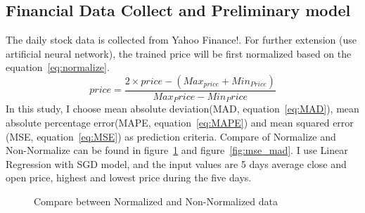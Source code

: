 \documentclass[12pt,a4paper]{scrartcl}
\begin{document}
	\subsection{Financial Data Collect and Preliminary model}
	The daily stock data is collected from Yahoo Finance!. For further extension (use artificial neural network\cite{nayak2014impact}), the trained price will be first normalized based on the equation~\ref{eq:normalize}.
	\begin{equation}
		\label{eq:normalize}
		price = \frac{2\times price - (Max_{price}+Min_{Price})}{Max_Price-Min_Price}
	\end{equation}
	In this study, I choose mean absolute deviation(MAD, equation~\ref{eq:MAD}), mean absolute percentage error(MAPE, equation~\ref{eq:MAPE}) and mean squared error (MSE, equation~\ref{eq:MSE}) as prediction criteria.
	Compare of Normalize and Non-Normalize can be found in figure~\ref{fig:non_vs_nor} and figure~\ref{fig:mse_mad}. I use Linear Regression with SGD model, and the input values are 5 days average close and open price, highest and lowest price during the five days. 
	\begin{figure}[ht]
		\centering
		\caption{Compare between Normalized and Non-Normalized data}
		\label{fig:non_vs_nor}
	\end{figure}
\end{document}
